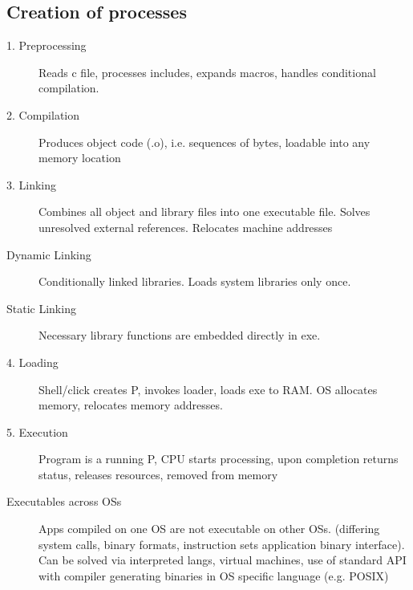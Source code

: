 \subsection{Creation of processes}
\begin{description}
  \item[1. Preprocessing] Reads c file, processes includes, expands macros, handles conditional compilation.
  \item[2. Compilation] Produces object code (.o), i.e. sequences of bytes, loadable into any memory location
  \item[3. Linking] Combines all object and library files into one executable file. Solves unresolved external references. Relocates machine addresses
  \item[Dynamic Linking] Conditionally linked libraries. Loads system libraries only once.
  \item[Static Linking] Necessary library functions are embedded directly in exe.
  \item[4. Loading] Shell/click creates P, invokes loader, loads exe to RAM. OS allocates memory, relocates memory addresses.
  \item[5. Execution] Program is a running P, CPU starts processing, upon completion returns status, releases resources, removed from memory



  \item[Executables across OSs] Apps compiled on one OS are not executable on other OSs. (differing system calls, binary formats, instruction sets application binary interface). Can be solved via interpreted langs, virtual machines, use of standard API with compiler generating binaries in OS specific language (e.g. POSIX)

\end{description}

